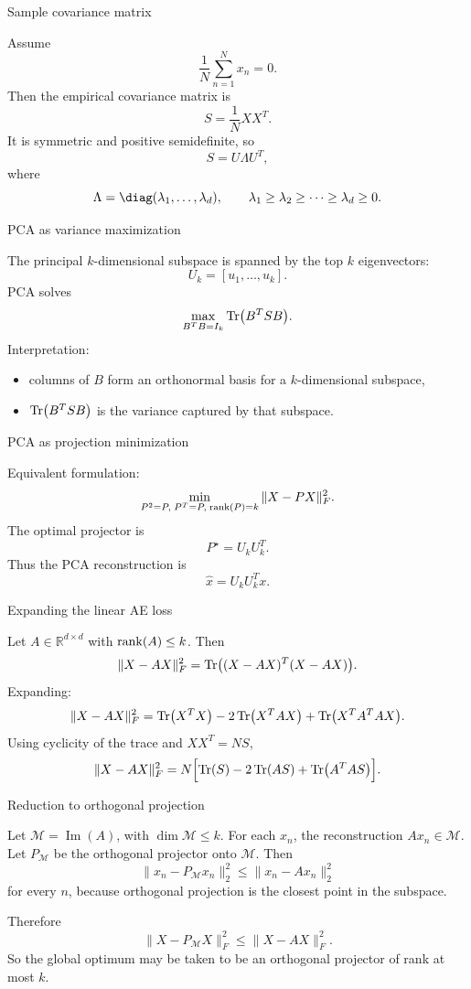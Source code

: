 \documentclass[aspectratio=169]{beamer}
\begin{document}
\begin{frame}{Sample covariance matrix}

Assume
\[
\frac{1}{N}\sum_{n=1}^N x_n = 0.
\]
Then the empirical covariance matrix is
\[
S = \frac{1}{N}XX^T.
\]
It is symmetric and positive semidefinite, so
\[
S=U\Lambda U^T,
\]
where
\[
\Lambda = \diag(\lambda_1,\dots,\lambda_d),
\qquad
\lambda_1\ge \lambda_2\ge \cdots \ge \lambda_d\ge 0.
\]

\end{frame}

\begin{frame}{PCA as variance maximization}

The principal \(k\)-dimensional subspace is spanned by the top \(k\) eigenvectors:
\[
U_k = [u_1,\dots,u_k].
\]
PCA solves
\[
\max_{B^TB=I_k}\Tr(B^T S B).
\]
Interpretation:
\begin{itemize}
\item columns of \(B\) form an orthonormal basis for a \(k\)-dimensional subspace,
\item \(\Tr(B^TSB)\) is the variance captured by that subspace.
\end{itemize}

\end{frame}

\begin{frame}{PCA as projection minimization}

Equivalent formulation:
\[
\min_{P^2=P,\; P^T=P,\; \rank(P)=k}\|X-PX\|_F^2.
\]
The optimal projector is
\[
P^\star = U_k U_k^T.
\]
Thus the PCA reconstruction is
\[
\hat x = U_k U_k^T x.
\]

\end{frame}

\begin{frame}{Expanding the linear AE loss}

Let \(A\in\mathbb{R}^{d\times d}\) with \(\rank(A)\le k\). Then
\[
\|X-AX\|_F^2
=
\Tr\bigl((X-AX)^T(X-AX)\bigr).
\]
Expanding:
\[
\|X-AX\|_F^2
=
\Tr(X^TX)-2\Tr(X^TAX)+\Tr(X^TA^TAX).
\]
Using cyclicity of the trace and \(XX^T = NS\),
\[
\|X-AX\|_F^2
=
N\Bigl[\Tr(S)-2\Tr(AS)+\Tr(A^TAS)\Bigr].
\]

\end{frame}

\begin{frame}{Reduction to orthogonal projection}

Let \(\mathcal{M}=\operatorname{Im}(A)\), with \(\dim \mathcal{M}\le k\).
For each \(x_n\), the reconstruction \(Ax_n\in \mathcal{M}\).
Let \(P_{\mathcal{M}}\) be the orthogonal projector onto \(\mathcal{M}\). Then
\[
\|x_n-P_{\mathcal{M}}x_n\|_2^2 \le \|x_n-Ax_n\|_2^2
\]
for every \(n\), because orthogonal projection is the closest point in the subspace.

Therefore
\[
\|X-P_{\mathcal{M}}X\|_F^2 \le \|X-AX\|_F^2.
\]
So the global optimum may be taken to be an orthogonal projector of rank at most \(k\).

\end{frame}
\end{document}
